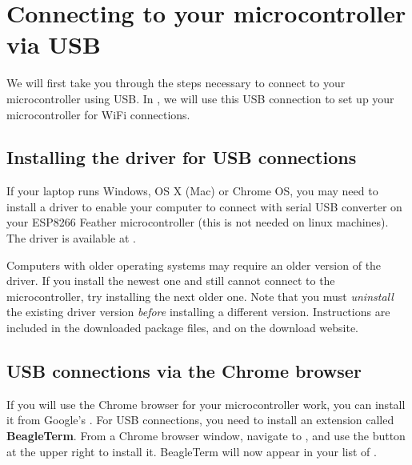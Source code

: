 \section{Connecting to your microcontroller via USB}
We will first take you through the steps necessary to connect to your microcontroller using USB. In , we will use this USB connection to set up your microcontroller for WiFi connections.

\subsection{Installing the driver for USB connections}
If your laptop runs Windows, OS X (Mac) or Chrome OS, you may need to install a driver to enable your computer to connect with serial USB converter on your ESP8266 Feather microcontroller (this is not needed on linux machines). 
The driver is available at . 

Computers with older operating systems may require an older version of the driver. 
If you install the newest one and still cannot connect to the microcontroller, try installing the next older one. 
Note that you must \emph{uninstall} the existing driver version \emph{before} installing a different version. 
Instructions are included in the downloaded package files, and on the download website.

\subsection{USB connections via the Chrome browser}
If you will use the Chrome browser for your microcontroller work, you can install it from Google's . 
For USB connections, you need to install an extension called \textbf{BeagleTerm}. 
From a Chrome browser window, navigate to  , and use the button at the upper right to install it. 
BeagleTerm will now appear in your list of .

